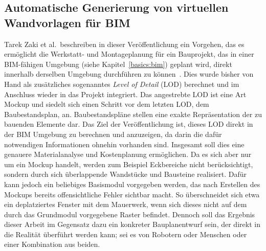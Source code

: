 \subsection{Automatische Generierung von virtuellen Wandvorlagen für BIM}
Tarek Zaki et al.\ beschreiben in dieser Veröffentlichung ein Vorgehen, das es ermöglicht die Werkstatt- und Montageplanung für ein Bauprojekt, das in einer BIM-fähigen Umgebung (siehe Kapitel~\ref{basics:bim}) geplant wird, direkt innerhalb derselben Umgebung durchführen zu können~\cite{Zaki2017}.
Dies wurde bisher von Hand als zusätzliches sogenanntes \textit{Level of Detail} (LOD) berechnet und im Anschluss wieder in das Projekt integriert.
Das angestrebte LOD ist eine Art Mockup und siedelt sich einen Schritt vor dem letzten LOD, dem Baubestandsplan, an.
Baubestandspläne stellen eine exakte Repräsentation der zu bauenden Elemente dar.
Das Ziel der Veröffentlichung ist, dieses LOD direkt in der BIM Umgebung zu berechnen und anzuzeigen, da darin die dafür notwendigen Informationen ohnehin vorhanden sind.
Insgesamt soll dies eine genauere Materialanalyse und Kostenplanung ermöglichen.
Da es sich aber \glqq{}nur\grqq{} um ein Mockup handelt, werden zum Beispiel Eckbereiche nicht berücksichtigt, sondern durch sich überlappende Wandstücke und Bausteine realisiert.
Dafür kann jedoch ein beliebiges Basismodul vorgegeben werden, das nach Erstellen des Mockups bereits offensichtliche Fehler sichtbar macht.
So überschneidet sich etwa ein deplatziertes Fenster mit dem Mauerwerk, wenn sich dieses nicht auf dem durch das Grundmodul vorgegebene Raster befindet.
Dennoch soll das Ergebnis dieser Arbeit im Gegensatz dazu ein konkreter Bauplanentwurf sein, der direkt in die Realität überführt werden kann; sei es von Robotern oder Menschen oder einer Kombination aus beiden.